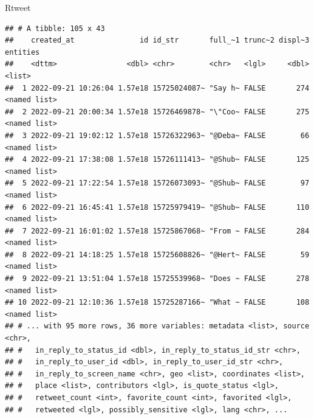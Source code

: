\documentclass[
  10pt,
  ignorenonframetext,
  aspectratio=169]{beamer}
\begin{document}
\begin{frame}[fragile]{Rtweet}
\begin{verbatim}
## # A tibble: 105 x 43
##    created_at               id id_str       full_~1 trunc~2 displ~3 entities    
##    <dttm>                <dbl> <chr>        <chr>   <lgl>     <dbl> <list>      
##  1 2022-09-21 10:26:04 1.57e18 15725024087~ "Say h~ FALSE       274 <named list>
##  2 2022-09-21 20:00:34 1.57e18 15726469878~ "\"Coo~ FALSE       275 <named list>
##  3 2022-09-21 19:02:12 1.57e18 15726322963~ "@Deba~ FALSE        66 <named list>
##  4 2022-09-21 17:38:08 1.57e18 15726111413~ "@Shub~ FALSE       125 <named list>
##  5 2022-09-21 17:22:54 1.57e18 15726073093~ "@Shub~ FALSE        97 <named list>
##  6 2022-09-21 16:45:41 1.57e18 15725979419~ "@Shub~ FALSE       110 <named list>
##  7 2022-09-21 16:01:02 1.57e18 15725867068~ "From ~ FALSE       284 <named list>
##  8 2022-09-21 14:18:25 1.57e18 15725608826~ "@Hert~ FALSE        59 <named list>
##  9 2022-09-21 13:51:04 1.57e18 15725539968~ "Does ~ FALSE       278 <named list>
## 10 2022-09-21 12:10:36 1.57e18 15725287166~ "What ~ FALSE       108 <named list>
## # ... with 95 more rows, 36 more variables: metadata <list>, source <chr>,
## #   in_reply_to_status_id <dbl>, in_reply_to_status_id_str <chr>,
## #   in_reply_to_user_id <dbl>, in_reply_to_user_id_str <chr>,
## #   in_reply_to_screen_name <chr>, geo <list>, coordinates <list>,
## #   place <list>, contributors <lgl>, is_quote_status <lgl>,
## #   retweet_count <int>, favorite_count <int>, favorited <lgl>,
## #   retweeted <lgl>, possibly_sensitive <lgl>, lang <chr>, ...
\end{verbatim}
\end{frame}
\end{document}
